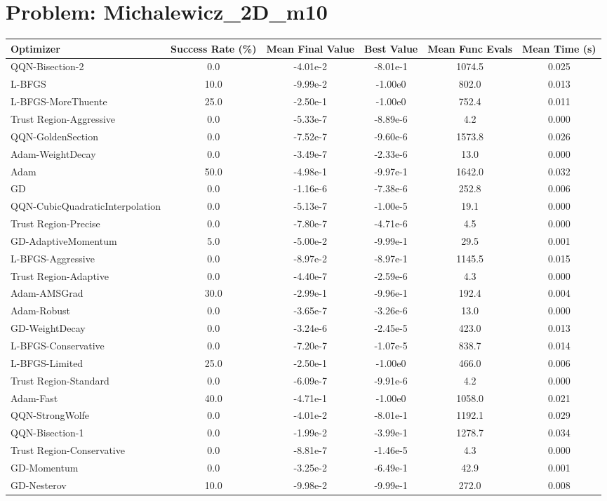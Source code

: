 \documentclass{article}
\begin{document}
\section{Problem: Michalewicz\_2D\_m10}
\begin{longtable}{p{3cm}*{5}{c}}
\toprule
\textbf{Optimizer} & \textbf{Success Rate (\%)} & \textbf{Mean Final Value} & \textbf{Best Value} & \textbf{Mean Func Evals} & \textbf{Mean Time (s)} \\
\midrule
QQN-Bisection-2 & 0.0 & -4.01e-2 & -8.01e-1 & 1074.5 & 0.025 \\
L-BFGS & 10.0 & -9.99e-2 & -1.00e0 & 802.0 & 0.013 \\
L-BFGS-MoreThuente & 25.0 & -2.50e-1 & -1.00e0 & 752.4 & 0.011 \\
Trust Region-Aggressive & 0.0 & -5.33e-7 & -8.89e-6 & 4.2 & 0.000 \\
QQN-GoldenSection & 0.0 & -7.52e-7 & -9.60e-6 & 1573.8 & 0.026 \\
Adam-WeightDecay & 0.0 & -3.49e-7 & -2.33e-6 & 13.0 & 0.000 \\
Adam & 50.0 & -4.98e-1 & -9.97e-1 & 1642.0 & 0.032 \\
GD & 0.0 & -1.16e-6 & -7.38e-6 & 252.8 & 0.006 \\
QQN-CubicQuadraticInterpolation & 0.0 & -5.13e-7 & -1.00e-5 & 19.1 & 0.000 \\
Trust Region-Precise & 0.0 & -7.80e-7 & -4.71e-6 & 4.5 & 0.000 \\
GD-AdaptiveMomentum & 5.0 & -5.00e-2 & -9.99e-1 & 29.5 & 0.001 \\
L-BFGS-Aggressive & 0.0 & -8.97e-2 & -8.97e-1 & 1145.5 & 0.015 \\
Trust Region-Adaptive & 0.0 & -4.40e-7 & -2.59e-6 & 4.3 & 0.000 \\
Adam-AMSGrad & 30.0 & -2.99e-1 & -9.96e-1 & 192.4 & 0.004 \\
Adam-Robust & 0.0 & -3.65e-7 & -3.26e-6 & 13.0 & 0.000 \\
GD-WeightDecay & 0.0 & -3.24e-6 & -2.45e-5 & 423.0 & 0.013 \\
L-BFGS-Conservative & 0.0 & -7.20e-7 & -1.07e-5 & 838.7 & 0.014 \\
L-BFGS-Limited & 25.0 & -2.50e-1 & -1.00e0 & 466.0 & 0.006 \\
Trust Region-Standard & 0.0 & -6.09e-7 & -9.91e-6 & 4.2 & 0.000 \\
Adam-Fast & 40.0 & -4.71e-1 & -1.00e0 & 1058.0 & 0.021 \\
QQN-StrongWolfe & 0.0 & -4.01e-2 & -8.01e-1 & 1192.1 & 0.029 \\
QQN-Bisection-1 & 0.0 & -1.99e-2 & -3.99e-1 & 1278.7 & 0.034 \\
Trust Region-Conservative & 0.0 & -8.81e-7 & -1.46e-5 & 4.3 & 0.000 \\
GD-Momentum & 0.0 & -3.25e-2 & -6.49e-1 & 42.9 & 0.001 \\
GD-Nesterov & 10.0 & -9.98e-2 & -9.99e-1 & 272.0 & 0.008 \\
\bottomrule
\end{longtable}
\end{document}
